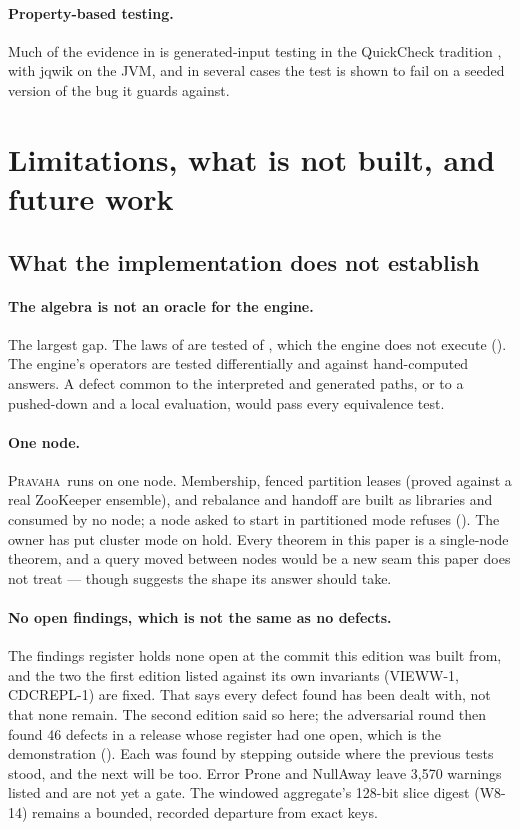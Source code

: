 \documentclass[11pt,a4paper]{article}
\renewcommand{\_}{\oldunderscore\allowbreak}
\newcommand{\Pv}{\textsc{Pravaha}}
\newcommand{\code}[1]{\texttt{\pvbreakable{#1}}}
\begin{document}
\paragraph{Property-based testing.} Much of the evidence in  is generated-input
testing in the QuickCheck tradition \cite{claessen2000}, with jqwik on the JVM, and in several cases the
test is shown to fail on a seeded version of the bug it guards against.

\section{Limitations, what is not built, and future work}\label{sec:limits}

\subsection{What the implementation does not establish}

\paragraph{The algebra is not an oracle for the engine.} The largest gap. The laws of
 are tested of \code{pravaha-algebra}, which the engine does not execute
(). The engine's operators are tested differentially and against hand-computed
answers. A defect common to the interpreted and generated paths, or to a pushed-down and a local
evaluation, would pass every equivalence test.

\paragraph{One node.} \Pv\ runs on one node. Membership, fenced partition leases (proved against a real
ZooKeeper ensemble), and rebalance and handoff are built as libraries and consumed by no node; a node
asked to start in partitioned mode refuses (\code{PRV-9002}). The owner has put cluster mode on hold.
Every theorem in this paper is a single-node theorem, and a query moved between nodes would be a new
seam this paper does not treat --- though  suggests the shape its answer should take.

\paragraph{No open findings, which is not the same as no defects.} The findings register holds none open
at the commit this edition was built from, and the two the first edition listed against its own invariants
(VIEWW-1, CDCREPL-1) are fixed. That says every defect found has been dealt with, not that none remain.
The second edition said so here; the adversarial round then found 46 defects in a release whose register
had one open, which is the demonstration (). Each was found by stepping
outside where the previous tests stood, and the next will be too. Error Prone and NullAway leave 3{,}570
warnings listed and are not yet a gate. The windowed
aggregate's 128-bit slice digest (W8-14) remains a bounded, recorded departure from exact keys.
\end{document}
